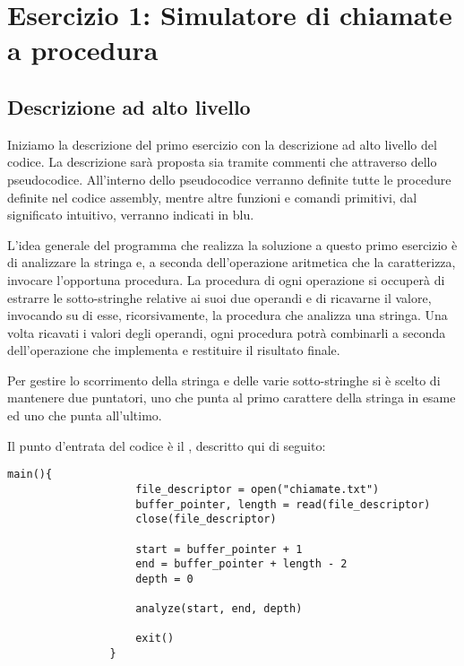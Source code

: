 \section*{Esercizio 1: Simulatore di chiamate a procedura}

	\subsection*{Descrizione ad alto livello}
	
		Iniziamo la descrizione del primo esercizio con la descrizione ad alto livello del codice. La descrizione sarà proposta sia tramite commenti che attraverso dello pseudocodice. All'interno dello pseudocodice verranno definite tutte le procedure definite nel codice assembly, mentre altre funzioni e comandi primitivi, dal significato intuitivo, verranno indicati in blu.
		
		L'idea generale del programma che realizza la soluzione a questo primo esercizio è di analizzare la stringa e, a seconda dell'operazione aritmetica che la caratterizza, invocare l'opportuna procedura. La procedura di ogni operazione si occuperà di estrarre le sotto-stringhe relative ai suoi due operandi e di ricavarne il valore, invocando su di esse, ricorsivamente, la procedura che analizza una stringa. Una volta ricavati i valori degli operandi, ogni procedura potrà combinarli a seconda dell'operazione che implementa e restituire il risultato finale.
		
		Per gestire lo scorrimento della stringa e delle varie sotto-stringhe si è scelto di mantenere due puntatori, uno che punta al primo carattere della stringa in esame ed uno che punta all'ultimo.
		
		Il punto d'entrata del codice è il , descritto qui di seguito:
		
        \begin{center}
           	\begin{lstlisting}[language=pseudo, gobble=14]
                main(){
                    file_descriptor = open("chiamate.txt")
                    buffer_pointer, length = read(file_descriptor)
                    close(file_descriptor)
    	           	
                    start = buffer_pointer + 1
                    end = buffer_pointer + length - 2
                    depth = 0
    	           	
                    analyze(start, end, depth)
    	           	
                    exit()
                }\end{lstlisting}
        \end{center}
        
